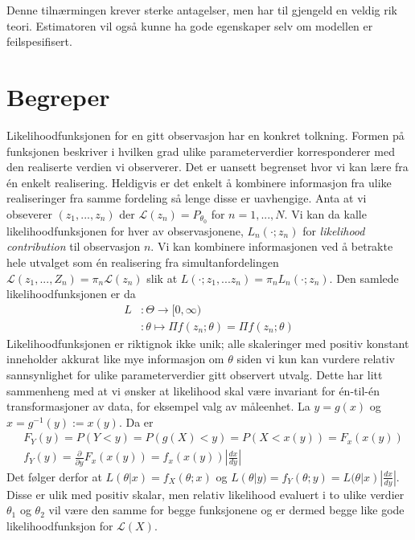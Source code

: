 Denne tilnærmingen krever sterke antagelser, men har til gjengeld en veldig rik teori. Estimatoren vil også kunne ha gode egenskaper selv om modellen er feilspesifisert.
\section{Begreper}
Likelihoodfunksjonen for en gitt observasjon har en konkret tolkning. Formen på funksjonen beskriver i hvilken grad ulike parameterverdier korresponderer med den realiserte verdien vi observerer. Det er uansett begrenset hvor vi kan lære fra én enkelt realisering. Heldigvis er det enkelt å kombinere informasjon fra ulike realiseringer fra samme fordeling så lenge disse er uavhengige. Anta at vi obseverer $(z_1,...,z_n)$ der $\mathcal{L}(z_n) = P_{\theta_0}$ for $n=1,...,N$. Vi kan da kalle likelihoodfunksjonen for hver av observasjonene, $L_n(\cdot;z_n)$ for \textit{likelihood contribution} til observasjon $n$. Vi kan kombinere informasjonen ved å betrakte hele utvalget som én realisering fra simultanfordelingen $\mathcal{L}(z_1,...,Z_n) = \pi_n \mathcal{L}(z_n)$ slik at $L(\cdot;z_1,...z_n) = \pi_n L_n(\cdot;z_n)$. Den samlede likelihoodfunksjonen er da
\begin{align}
L &: \Theta \to [0,\infty) \\
&: \theta \mapsto \Pi f ( z_n ; \theta) = \Pi f ( z_n ; \theta)
\end{align}
Likelihoodfunksjonen er riktignok ikke unik; alle skaleringer med positiv konstant inneholder akkurat like mye informasjon om $\theta$ siden vi kun kan vurdere relativ sannsynlighet for ulike parameterverdier gitt observert utvalg. Dette har litt sammenheng med at vi ønsker at likelihood skal være invariant for én-til-én transformasjoner av data, for eksempel valg av måleenhet. La $y = g(x)$ og $x = g^{-1}(y) := x(y)$. Da er
\begin{align}
&F_Y(y) = P(Y<y) = P(g(X)<y) = P(X < x(y)) = F_x(x(y)) \\
& f_Y(y) = \frac{\partial}{\partial y} F_x(x(y)) = f_x(x(y))|\frac{dx}{dy}|
\end{align}
Det følger derfor at $L(\theta|x) = f_X(\theta;x)$ og $L(\theta|y) = f_Y(\theta;y) = L(\theta|x)|\frac{dx}{dy}|$. Disse er ulik med positiv skalar, men relativ likelihood evaluert i to ulike verdier $\theta_1$ og $\theta_2$ vil være den samme for begge funksjonene og er dermed begge like gode likelihoodfunksjon for $\mathcal{L}(X)$.

